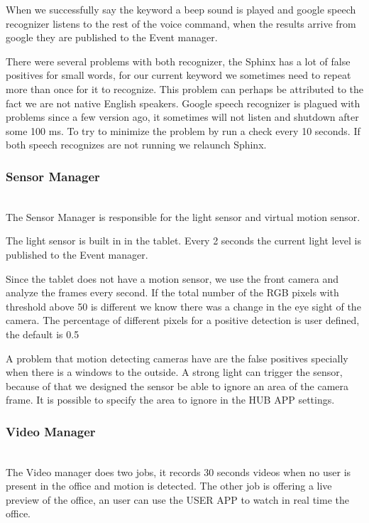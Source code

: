 When we successfully say the keyword a beep sound is played and google speech recognizer listens to the rest of the voice command, when the results arrive from google they are published to the Event manager.

There were several problems with both recognizer, the Sphinx has a lot of false positives for small words, for our current keyword we sometimes need to repeat more than once for it to recognize. This problem can perhaps be attributed to the fact we are not native English speakers. 
Google speech recognizer is plagued with problems since a few version ago, it sometimes will not listen and shutdown after some 100 ms. To try to minimize the problem by run a check every 10 seconds. If both speech recognizes are not running we relaunch Sphinx.

\subsubsection{Sensor Manager}\mbox{}\\

The Sensor Manager is responsible for the light sensor and virtual motion sensor.

The light sensor is built in in the tablet. Every 2 seconds the current light level is published to the Event manager. 

Since the tablet does not have a motion sensor, we use the front camera and analyze the frames every second. If the total number of the RGB pixels with threshold above 50 is different we know there was a change in the eye sight of the camera. The percentage of different pixels for a positive detection is user defined, the default is 0.5%

A problem that motion detecting cameras have are the false positives specially when there is a windows to the outside. A strong light can trigger the sensor, because of that we designed the sensor be able to ignore an area of the camera frame. It is possible to specify the area to ignore in the HUB APP settings.


\subsubsection{Video Manager}\mbox{}\\

The Video manager does two jobs, it records 30 seconds videos when no user is present in the office and motion is detected. The other job is offering a live preview of the office, an user can use the USER APP to watch in real time the office.

